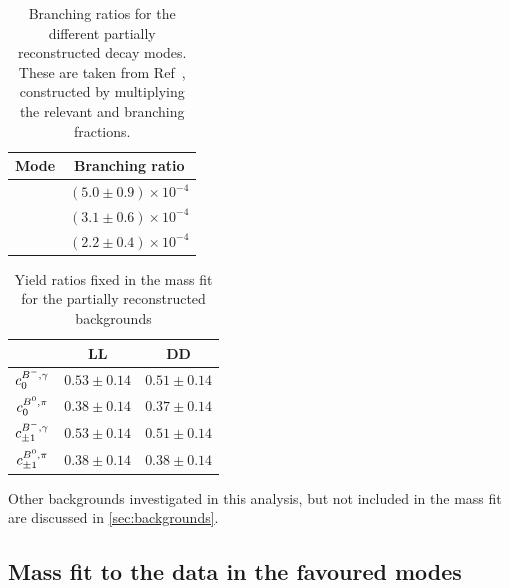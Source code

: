 \begin{table}[h]
\centering
\begin{tabular}{c|c}
Mode & Branching ratio \\
\hline
\decay{\Bm}{(\decay{\Dstarz}{\Dz\piz})\Kstarm} & $(5.0 \pm 0.9) \times 10^{-4}$ \\
\decay{\Bm}{(\decay{\Dstarz}{\Dz\gamma})\Kstarm} & $(3.1 \pm 0.6) \times 10^{-4}$ \\
\decay{\Bd}{(\decay{\Dstarp}{\Dz\pip})\Kstarm} & $(2.2 \pm 0.4) \times 10^{-4}$ \\
\end{tabular}
\caption{Branching ratios for the different partially reconstructed decay modes. These are taken from Ref~\cite{PDG2016}, constructed by multiplying the relevant \B and \Dstar branching fractions.}
\label{partrecoBRs}
\end{table}

\begin{table}[h]
\centering
\begin{tabular}{ccc}
\hline
& LL & DD \\
\hline
$c^{{{{B}^-}},\gamma}_0$ & $0.53 \pm 0.14$ & $0.51 \pm 0.14$ \\[3mm]
$c^{{{B}^0},\pi}_0$ & $0.38 \pm 0.14$ & $0.37 \pm 0.14$ \\[3mm]
$c^{{{{B}^-}},\gamma}_{\pm 1}$ & $0.53 \pm 0.14$ & $0.51 \pm 0.14$ \\[3mm]
$c^{{{B}^0},\pi}_{\pm 1}$ & $0.38 \pm 0.14$ & $0.38 \pm 0.14$ \\[3mm]
\hline
\end{tabular}
\caption{Yield ratios fixed in the mass fit for the partially reconstructed backgrounds}
\label{fixedyieldratios}
\end{table}

Other backgrounds investigated in this analysis, but not included in the mass fit are discussed in \sect\ref{sec:backgrounds}.


\subsection{Mass fit to the data in the favoured modes}
\label{sec:massfit:fit}

